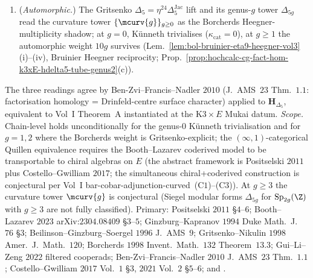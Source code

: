 \begin{proposition}
\begin{enumerate}[label=(\roman*),leftmargin=1.5em]
 the chiral centre
 $Z^{\mathrm{der}}_{\mathrm{ch}}(\mathbf H_{\Delta_5})$ is the
 Morita-invariant shadow, read at the $\Phi_3$-functor level.
 \item (\emph{Automorphic.}) The Gritsenko
 $\Delta_5=\eta^{24}\Delta_5^{\mathrm{Jac}}$ lift and its
 genus-$g$ tower $\Delta_{5g}$ read the curvature tower
 $\{\mcurv{g}\}_{g\ge 0}$ as the Borcherds Heegner-multiplicity
 shadow; at $g=0$, K\"unneth trivialises
 ($\kappa_{\mathrm{cat}}=0$), at $g\ge 1$ the automorphic weight
 $10g$ survives (Lem.~\ref{lem:bol-bruinier-eta9-heegner-vol3}(i)--(iv),
 Bruinier Heegner reciprocity; Prop.\ \ref{prop:hochcalc-cg-fact-hom-k3xE-hdelta5-tube-genus2}(c)).
\end{enumerate}
The three readings agree by Ben-Zvi--Francis--Nadler $2010$
(J.\ AMS~$23$ Thm.\ $1.1$: factorisation homology = Drinfeld-centre
surface character) applied to $\mathbf H_{\Delta_5}$, equivalent
to Vol~I Theorem~A instantiated at the K$3\times E$ Mukai
datum. \emph{Scope.} Chain-level holds unconditionally for the
genus-$0$ K\"unneth trivialisation and for $g=1,2$ where the
Borcherds weight is Gritsenko-explicit; the
$(\infty,1)$-categorical Quillen equivalence requires the
Booth--Lazarev coderived model to be transportable to chiral
algebras on $E$ (the abstract framework is Positselski $2011$
plus Costello--Gwilliam $2017$; the simultaneous chiral+coderived
construction is conjectural per
Vol~I bar-cobar-adjunction-curved~(C$1$)--(C$3$)). At $g\ge 3$ the
curvature tower $\mcurv{g}$ is conjectural (Siegel modular forms
$\Delta_{5g}$ for $\mathrm{Sp}_{2g}(\Z)$ with $g\ge 3$ are not
fully classified). Primary: Positselski $2011$ \S$4$--$6$;
Booth--Lazarev $2023$ arXiv:$2304.08409$ \S$3$--$5$;
Ginzburg--Kapranov $1994$ Duke Math.\ J.\ $76$ \S$3$;
Beilinson--Ginzburg--Soergel $1996$ J.\ AMS~$9$;
Gritsenko--Nikulin $1998$ Amer.\ J.\ Math.\ $120$;
Borcherds $1998$ Invent.\ Math.\ $132$ Theorem~$13.3$;
Gui--Li--Zeng $2022$ filtered cooperads;
Ben-Zvi--Francis--Nadler $2010$ J.\ AMS~$23$ Thm.\ $1.1$;
Costello--Gwilliam $2017$ Vol.\ $1$ \S$3$, $2021$ Vol.\ $2$ \S$5$--$6$;
\cite{VolI}
and \cite{VolI}.
\end{proposition}

